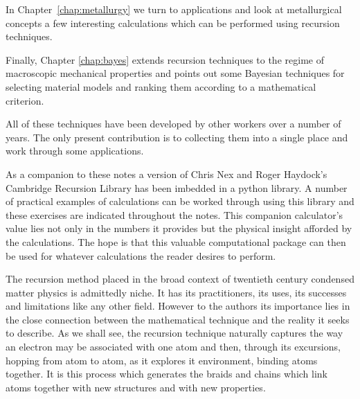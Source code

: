 In Chapter~\ref{chap:metallurgy} we turn to applications and
look at metallurgical concepts a few interesting calculations which can be performed 
using recursion techniques. 

Finally, Chapter \ref{chap:bayes} extends recursion techniques
to the regime of macroscopic mechanical properties 
and points out some Bayesian techniques 
for selecting material models and ranking them according 
to a mathematical criterion. 

All of these techniques have been developed by other workers 
over a number of years. The only present contribution is to 
collecting them into a single place 
and work through some applications.

As a companion to these notes a version of Chris Nex and 
Roger Haydock's Cambridge Recursion Library
has been imbedded in a python library. A number of practical examples 
of calculations can be worked through using this library and these 
exercises are indicated throughout the notes. 
This companion calculator's value lies not only
in the numbers it provides but the physical insight afforded by the 
calculations. The hope is that this valuable computational package can then be used for 
whatever calculations the reader desires to perform.

The recursion method placed in the broad context of twentieth century 
condensed matter physics is admittedly niche. It has its practitioners, 
its uses, its successes and limitations like any other field.
However to the authors its importance lies in the close connection between the mathematical
technique and the reality it seeks to describe. As we shall see, 
the recursion technique naturally captures the way 
an electron may be associated with 
one atom and then, through its excursions, hopping from atom to atom, 
as it explores it environment, binding atoms together. 
It is this process which
generates the braids and chains which link atoms together 
with new structures and with new properties.


